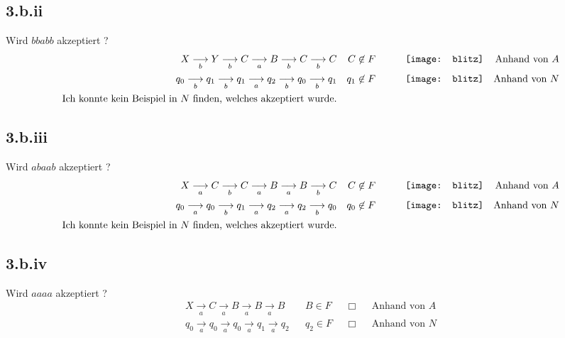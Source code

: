 \documentclass[10pt,ngerman]{scrartcl}
\begin{document}
\subsection{3.b.ii}
Wird $bbabb$ akzeptiert ?
\begin{align*}
 X \underset{b}{\longrightarrow} Y \underset{b}{\longrightarrow} C \underset{a}{\longrightarrow} B \underset{b}{\longrightarrow} C \underset{b}{\longrightarrow} C  && C \not \in F && \qquad \vcenter{\hbox{\texttt{[image: blitz]}}} && \text{Anhand von } A\\
 q_0 \underset{b}{\longrightarrow} q_1 \underset{b}{\longrightarrow} q_1 \underset{a}{\longrightarrow} q_2 \underset{b}{\longrightarrow} q_0 \underset{b}{\longrightarrow} q_1  && q_1 \not \in F && \qquad \vcenter{\hbox{\texttt{[image: blitz]}}} && \text{Anhand von } N\\
 \text{Ich konnte kein Beispiel in }N\text{ finden, welches akzeptiert wurde.} && &&
\end{align*}
\subsection{3.b.iii}
Wird $abaab$ akzeptiert ?
\begin{align*}
 X \underset{a}{\longrightarrow} C \underset{b}{\longrightarrow} C \underset{a}{\longrightarrow} B \underset{a}{\longrightarrow} B \underset{b}{\longrightarrow} C   && C \not \in F && \qquad \vcenter{\hbox{\texttt{[image: blitz]}}} && \text{Anhand von } A\\
 q_0 \underset{a}{\longrightarrow} q_0 \underset{b}{\longrightarrow} q_1 \underset{a}{\longrightarrow} q_2 \underset{a}{\longrightarrow} q_2 \underset{b}{\longrightarrow} q_0   && q_0 \not \in F && \qquad \vcenter{\hbox{\texttt{[image: blitz]}}} && \text{Anhand von } N\\
 \text{Ich konnte kein Beispiel in }N\text{ finden, welches akzeptiert wurde.} && &&
\end{align*}
\subsection{3.b.iv}
Wird $aaaa$ akzeptiert ?
\begin{align*}
 X \underset{a}{\longrightarrow} C \underset{a}{\longrightarrow} B \underset{a}{\longrightarrow} B \underset{a}{\longrightarrow} B  && B \in F && \Box && \text{Anhand von } A \\
  q_0 \underset{a}{\longrightarrow} q_0 \underset{a}{\longrightarrow} q_0 \underset{a}{\longrightarrow} q_1 \underset{a}{\longrightarrow} q_2  && q_2 \in F && \Box && \text{Anhand von } N
\end{align*}
\end{document}
